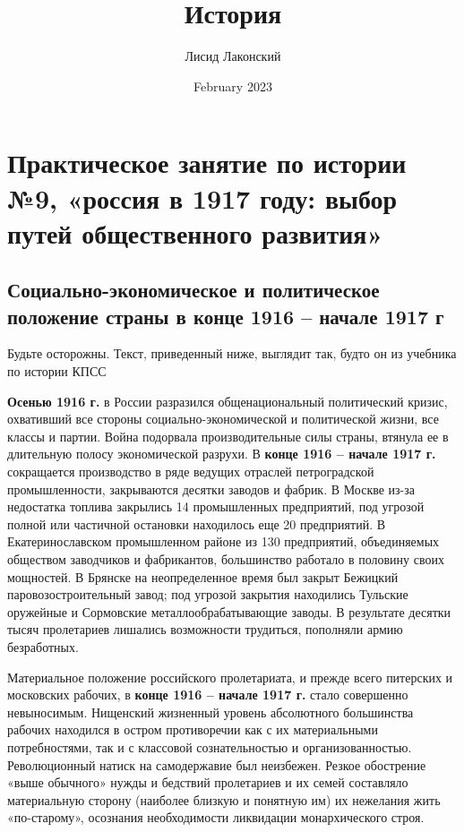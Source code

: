 \documentclass{article}
\title{История}
\author{Лисид Лаконский}
\date{February 2023}
\newenvironment{important}[1][]{%
   \begin{mdframed}[%
      backgroundcolor={red!15}, hidealllines=true,
      skipabove=0.7\baselineskip, skipbelow=0.7\baselineskip,
      splitbottomskip=2pt, splittopskip=4pt, #1]%
   \makebox[0pt]{%
      \smash{%
         \fontsize{32pt}{32pt}\selectfont%
         \hspace*{-19pt}%
         \raisebox{-2pt}{%
            {\color{red!70!black}\sffamily\bfseries !}%
         }%
      }%
   }%
}{\end{mdframed}}
\begin{document}
\raggedright

\maketitle
\tableofcontents
\pagebreak

\section{Практическое занятие по истории №9, «россия в 1917 году: выбор путей общественного развития»}

\subsection{Социально-экономическое и политическое положение страны в конце 1916 – начале 1917 г}

\begin{important}
    Будьте осторожны. Текст, приведенный ниже, выглядит так, будто он из учебника по истории КПСС
\end{important}

 \textbf{Осенью 1916 г.} в России разразился общенациональный политический кризис, охвативший все стороны социально-экономической и политической жизни, все классы и партии. Война подорвала производительные силы страны, втянула ее в длительную полосу экономической разрухи. В \textbf{конце 1916 – начале 1917 г.} сокращается производство в ряде ведущих отраслей петроградской промышленности, закрываются десятки заводов и фабрик. В Москве из-за недостатка топлива закрылись 14 промышленных предприятий, под угрозой полной или частичной остановки находилось еще 20 предприятий. В Екатеринославском промышленном районе из 130 предприятий, объединяемых обществом заводчиков и фабрикантов, большинство работало в половину своих мощностей. В Брянске на неопределенное время был закрыт Бежицкий паровозостроительный завод; под угрозой закрытия находились Тульские оружейные и Сормовские металлообрабатывающие заводы. В результате десятки тысяч пролетариев лишались возможности трудиться, пополняли армию безработных.

 \hfill

Материальное положение российского пролетариата, и прежде всего питерских и московских рабочих, в \textbf{конце 1916 – начале 1917 г.} стало совершенно невыносимым. Нищенский жизненный уровень абсолютного большинства рабочих находился в остром противоречии как с их материальными потребностями, так и с классовой сознательностью и организованностью. Революционный натиск на самодержавие был неизбежен. Резкое обострение «выше обычного» нужды и бедствий пролетариев и их семей составляло материальную сторону (наиболее близкую и понятную им) их нежелания жить «по-старому», осознания необходимости ликвидации монархического строя.
\end{document}
